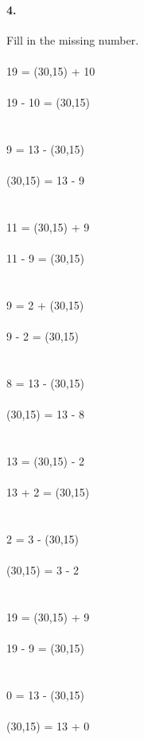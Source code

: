\documentclass[12pt]{article}
\begin{document}
\paragraph{4.}
Fill in the missing number. \\
\\
19 = \framebox(30,15){} + 10
\\
\\
19 - 10 = \framebox(30,15){}
\\
\\
\\
9 = 13 - \framebox(30,15){}
\\
\\
\framebox(30,15){} = 13 - 9
\\
\\
\\
11 = \framebox(30,15){} + 9
\\
\\
11 - 9 = \framebox(30,15){}
\\
\\
\\
9 = 2 + \framebox(30,15){}
\\
\\
9 - 2 = \framebox(30,15){}
\\
\\
\\
8 = 13 - \framebox(30,15){}
\\
\\
\framebox(30,15){} = 13 - 8
\\
\\
\\
13 = \framebox(30,15){} - 2
\\
\\
13 + 2 = \framebox(30,15){}
\\
\\
\\
2 = 3 - \framebox(30,15){}
\\
\\
\framebox(30,15){} = 3 - 2
\\
\\
\\
19 = \framebox(30,15){} + 9
\\
\\
19 - 9 = \framebox(30,15){}
\\
\\
\\
0 = 13 - \framebox(30,15){}
\\
\\
\framebox(30,15){} = 13 + 0
\\
\end{document}
